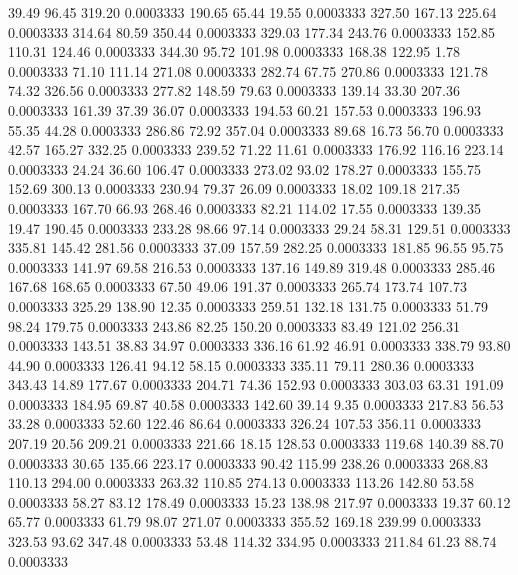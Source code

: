   39.49   96.45  319.20   0.0003333
 190.65   65.44   19.55   0.0003333
 327.50  167.13  225.64   0.0003333
 314.64   80.59  350.44   0.0003333
 329.03  177.34  243.76   0.0003333
 152.85  110.31  124.46   0.0003333
 344.30   95.72  101.98   0.0003333
 168.38  122.95    1.78   0.0003333
  71.10  111.14  271.08   0.0003333
 282.74   67.75  270.86   0.0003333
 121.78   74.32  326.56   0.0003333
 277.82  148.59   79.63   0.0003333
 139.14   33.30  207.36   0.0003333
 161.39   37.39   36.07   0.0003333
 194.53   60.21  157.53   0.0003333
 196.93   55.35   44.28   0.0003333
 286.86   72.92  357.04   0.0003333
  89.68   16.73   56.70   0.0003333
  42.57  165.27  332.25   0.0003333
 239.52   71.22   11.61   0.0003333
 176.92  116.16  223.14   0.0003333
  24.24   36.60  106.47   0.0003333
 273.02   93.02  178.27   0.0003333
 155.75  152.69  300.13   0.0003333
 230.94   79.37   26.09   0.0003333
  18.02  109.18  217.35   0.0003333
 167.70   66.93  268.46   0.0003333
  82.21  114.02   17.55   0.0003333
 139.35   19.47  190.45   0.0003333
 233.28   98.66   97.14   0.0003333
  29.24   58.31  129.51   0.0003333
 335.81  145.42  281.56   0.0003333
  37.09  157.59  282.25   0.0003333
 181.85   96.55   95.75   0.0003333
 141.97   69.58  216.53   0.0003333
 137.16  149.89  319.48   0.0003333
 285.46  167.68  168.65   0.0003333
  67.50   49.06  191.37   0.0003333
 265.74  173.74  107.73   0.0003333
 325.29  138.90   12.35   0.0003333
 259.51  132.18  131.75   0.0003333
  51.79   98.24  179.75   0.0003333
 243.86   82.25  150.20   0.0003333
  83.49  121.02  256.31   0.0003333
 143.51   38.83   34.97   0.0003333
 336.16   61.92   46.91   0.0003333
 338.79   93.80   44.90   0.0003333
 126.41   94.12   58.15   0.0003333
 335.11   79.11  280.36   0.0003333
 343.43   14.89  177.67   0.0003333
 204.71   74.36  152.93   0.0003333
 303.03   63.31  191.09   0.0003333
 184.95   69.87   40.58   0.0003333
 142.60   39.14    9.35   0.0003333
 217.83   56.53   33.28   0.0003333
  52.60  122.46   86.64   0.0003333
 326.24  107.53  356.11   0.0003333
 207.19   20.56  209.21   0.0003333
 221.66   18.15  128.53   0.0003333
 119.68  140.39   88.70   0.0003333
  30.65  135.66  223.17   0.0003333
  90.42  115.99  238.26   0.0003333
 268.83  110.13  294.00   0.0003333
 263.32  110.85  274.13   0.0003333
 113.26  142.80   53.58   0.0003333
  58.27   83.12  178.49   0.0003333
  15.23  138.98  217.97   0.0003333
  19.37   60.12   65.77   0.0003333
  61.79   98.07  271.07   0.0003333
 355.52  169.18  239.99   0.0003333
 323.53   93.62  347.48   0.0003333
  53.48  114.32  334.95   0.0003333
 211.84   61.23   88.74   0.0003333
